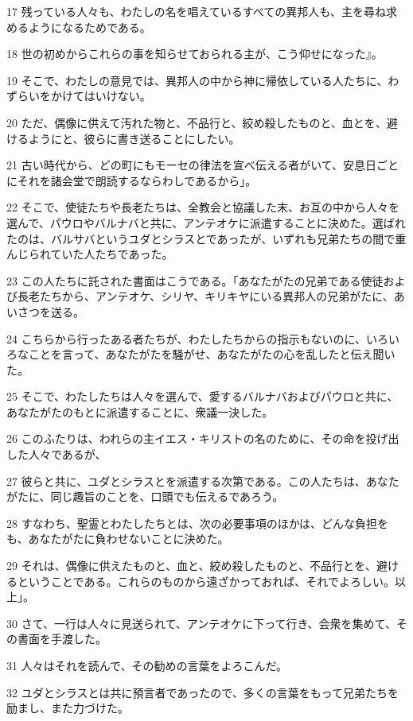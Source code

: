 \par 17 残っている人々も、わたしの名を唱えているすべての異邦人も、主を尋ね求めるようになるためである。
\par 18 世の初めからこれらの事を知らせておられる主が、こう仰せになった』。
\par 19 そこで、わたしの意見では、異邦人の中から神に帰依している人たちに、わずらいをかけてはいけない。
\par 20 ただ、偶像に供えて汚れた物と、不品行と、絞め殺したものと、血とを、避けるようにと、彼らに書き送ることにしたい。
\par 21 古い時代から、どの町にもモーセの律法を宣べ伝える者がいて、安息日ごとにそれを諸会堂で朗読するならわしであるから」。
\par 22 そこで、使徒たちや長老たちは、全教会と協議した末、お互の中から人々を選んで、パウロやバルナバと共に、アンテオケに派遣することに決めた。選ばれたのは、バルサバというユダとシラスとであったが、いずれも兄弟たちの間で重んじられていた人たちであった。
\par 23 この人たちに託された書面はこうである。「あなたがたの兄弟である使徒および長老たちから、アンテオケ、シリヤ、キリキヤにいる異邦人の兄弟がたに、あいさつを送る。
\par 24 こちらから行ったある者たちが、わたしたちからの指示もないのに、いろいろなことを言って、あなたがたを騒がせ、あなたがたの心を乱したと伝え聞いた。
\par 25 そこで、わたしたちは人々を選んで、愛するバルナバおよびパウロと共に、あなたがたのもとに派遣することに、衆議一決した。
\par 26 このふたりは、われらの主イエス・キリストの名のために、その命を投げ出した人々であるが、
\par 27 彼らと共に、ユダとシラスとを派遣する次第である。この人たちは、あなたがたに、同じ趣旨のことを、口頭でも伝えるであろう。
\par 28 すなわち、聖霊とわたしたちとは、次の必要事項のほかは、どんな負担をも、あなたがたに負わせないことに決めた。
\par 29 それは、偶像に供えたものと、血と、絞め殺したものと、不品行とを、避けるということである。これらのものから遠ざかっておれば、それでよろしい。以上」。
\par 30 さて、一行は人々に見送られて、アンテオケに下って行き、会衆を集めて、その書面を手渡した。
\par 31 人々はそれを読んで、その勧めの言葉をよろこんだ。
\par 32 ユダとシラスとは共に預言者であったので、多くの言葉をもって兄弟たちを励まし、また力づけた。
